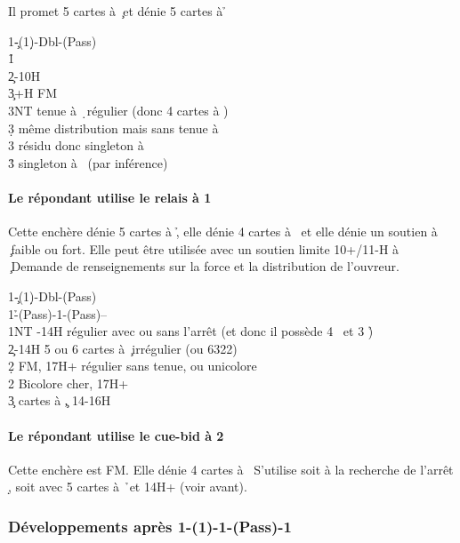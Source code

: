 \documentclass[a4paper]{article}
\begin{document}
Il promet 5 cartes à \c\ et dénie 5 cartes à \h 

\begin{bidtable}
1\c-(1\d)-Dbl-(Pass)\\
1\h\+\\
2\c {}-10H\\
3\c {}+H FM\+\\
3NT \> tenue à \d\ régulier (donc 4 cartes à \s )\\
3\d \> même distribution mais sans tenue à \d \\
3\s \> résidu donc singleton à \d \\
3\h \> singleton à \s\ (par inférence)\-\-
\end{bidtable}

\paragraph{Le répondant utilise le relais à 1 \pdfs}

Cette enchère dénie 5 cartes à \h , elle dénie 4 cartes à \s\ et elle dénie un soutien à \c\ faible ou fort.
Elle peut être utilisée avec un soutien limite 10+/11-H à \c\ 
Demande de renseignements sur la force et la distribution de l’ouvreur.

\begin{bidtable}
1\c-(1\d)-Dbl-(Pass)\\
1\h-(Pass)-1\s-(Pass)--\\
1NT -14H régulier avec ou sans l’arrêt (et donc il possède 4 \s\ et 3 \h )\\
2\c \> 12-14H 5 ou 6 cartes à \c\ irrégulier (ou 6322)\\
2\d \> FM, 17H+ régulier sans tenue, ou unicolore \c \\
2\s \> Bicolore cher, 17H+\\
3\c {} cartes à \c , 14-16H
\end{bidtable}

\paragraph{Le répondant utilise le cue-bid à 2 \pdfd}

Cette enchère est FM. Elle dénie 4 cartes à \s\ 
S’utilise soit à la recherche de l’arrêt \d , soit avec 5 cartes à \h\ et 14H+ (voir avant).

\subsubsection{Développements après 1\pdfc-(1\pdfd)-1\pdfh-(Pass)-1\pdfs}
\end{document}
